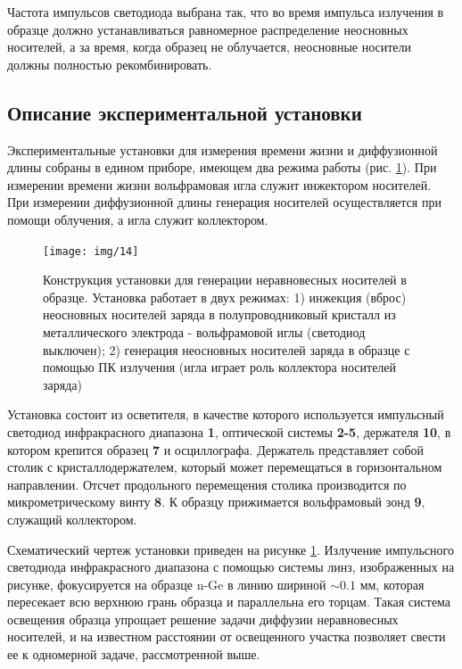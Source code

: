 Частота импульсов светодиода выбрана так, что во время импульса излучения в образце должно устанавливаться равномерное распределение неосновных носителей, а за время, когда образец не облучается, неосновные носители должны полностью рекомбинировать.

\subsection{Описание экспериментальной установки}

Экспериментальные установки для измерения времени жизни и диффузионной длины собраны в едином приборе, имеющем два режима работы (рис.  \ref{fig:figure13}). При измерении времени жизни вольфрамовая игла служит инжектором носителей. При измерении диффузионной длины генерация носителей осуществляется при помощи облучения, а игла служит коллектором.
\begin{figure}[H]
	\centering
	\texttt{[image: img/14]}
	\caption{Конструкция установки для генерации неравновесных носителей в образце. Установка работает в двух режимах: 1) инжекция (вброс) неосновных носителей заряда в полупроводниковый кристалл из металлического электрода - вольфрамовой иглы (светодиод выключен); 2) генерация неосновных носителей заряда в образце с помощью ПК излучения (игла играет роль коллектора носителей заряда)
}
	\label{fig:figure13}
\end{figure}


Установка состоит из осветителя, в качестве которого используется импульсный светодиод инфракрасного диапазона \textbf{1}, оптической системы \textbf{2-5}, держателя \textbf{10}, в котором крепится образец \textbf{7} и осциллографа. Держатель представляет собой столик с кристаллодержателем, который может перемещаться в горизонтальном направлении. Отсчет продольного перемещения столика производится по микрометрическому винту \textbf{8}. К образцу прижимается вольфрамовый зонд \textbf{9}, служащий коллектором.

Схематический чертеж установки приведен на рисунке \ref{fig:figure13}. Излучение импульсного светодиода инфракрасного диапазона с помощью системы линз, изображенных на рисунке, фокусируется на образце n-Ge в линию шириной $\sim0.1$ мм, которая пересекает всю верхнюю грань образца и параллельна его торцам. Такая система освещения образца упрощает решение задачи диффузии неравновесных носителей, и на известном расстоянии от освещенного участка позволяет свести ее к одномерной задаче, рассмотренной выше.

